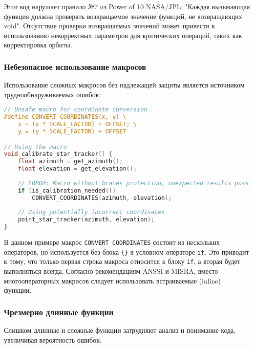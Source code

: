 Этот код нарушает правило №7 из Power of 10 NASA/JPL: "Каждая вызывающая функция должна проверять возвращаемое значение функций, не возвращающих void"\cite{reddit_learnprogramming}\cite{opensourcesatellite}. Отсутствие проверки возвращаемых значений может привести к использованию некорректных параметров для критических операций, таких как корректировка орбиты.

\subsubsection{Небезопасное использование макросов}

Использование сложных макросов без надлежащей защиты является источником труднообнаруживаемых ошибок\cite{anssi}:

\begin{lstlisting}[language=C, caption=Небезопасное использование макросов]
// Unsafe macro for coordinate conversion
#define CONVERT_COORDINATES(x, y) \
    x = (x * SCALE_FACTOR) + OFFSET; \
    y = (y * SCALE_FACTOR) + OFFSET

// Using the macro
void calibrate_star_tracker() {
    float azimuth = get_azimuth();
    float elevation = get_elevation();
    
    // ERROR: Macro without braces protection, unexpected results possible
    if (is_calibration_needed())
        CONVERT_COORDINATES(azimuth, elevation);
    
    // Using potentially incorrect coordinates
    point_star_tracker(azimuth, elevation);
}
\end{lstlisting}

В данном примере макрос \texttt{CONVERT\_COORDINATES} состоит из нескольких операторов, но используется без блока \texttt{\{\}} в условном операторе \texttt{if}. Это приводит к тому, что только первая строка макроса относится к блоку \texttt{if}, а вторая будет выполняться всегда. Согласно рекомендациям ANSSI и MISRA, вместо многооператорных макросов следует использовать встраиваемые (inline) функции\cite{anssi}.

\subsubsection{Чрезмерно длинные функции}

Слишком длинные и сложные функции затрудняют анализ и понимание кода, увеличивая вероятность ошибок\cite{opensourcesatellite}:

